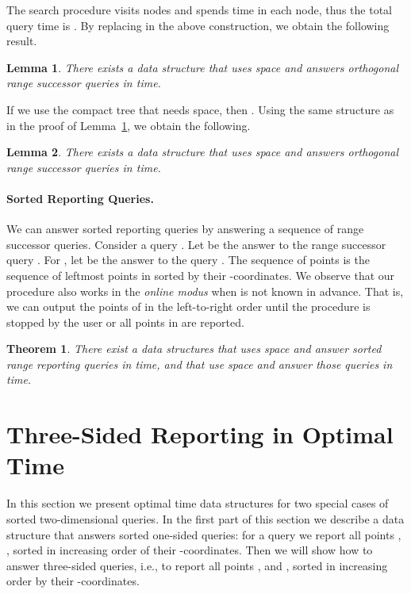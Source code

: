 \documentclass[11pt]{article}
\newcommand{\no}[1]{}
\newtheorem{theorem}{Theorem}
\newtheorem{lemma}{Lemma}
\begin{document}
The search procedure visits  nodes and spends
 time in each node, thus the total query time is
. By replacing  in the above
construction, we obtain the following result.
\begin{lemma}\label{lemma:linsucc}
  There exists a data structure that uses  space and answers
  orthogonal range successor queries in  time.
\end{lemma}
If we use the compact tree that needs  space,
then . Using the same structure as in the proof of 
Lemma~\ref{lemma:linsucc}, we obtain the following.
\begin{lemma}\label{lemma:llsucc}
  There exists a data structure that uses  space and
  answers orthogonal range successor queries in 
  time.
\end{lemma}


\paragraph{Sorted Reporting Queries.} 
We can answer sorted reporting queries by answering a sequence of 
range successor queries. Consider a query . 
Let  be the answer to the range successor query .
For , let  be the answer to the query 
.  
The sequence of points  is the sequence of  leftmost 
points in  sorted by their -coordinates. We observe 
that our procedure also works in the \emph{online modus} when   is not known in advance. That is, we can output the points of  in the left-to-right order until the procedure is stopped by the user or 
all points in  are reported.
\no{
 leftmost point,  then the next one, etc;   the query can be stopped at any time by 
the user. The total query time is the same as the time needed to answer 
 range successor queries. } 
\begin{theorem}\label{theor:spaceeff}
There exist a data structures that uses  space and answer
  sorted range reporting queries in  time, and that
use  space 
and answer those queries in  
time.
\end{theorem}




\section{Three-Sided Reporting in Optimal Time}
\label{sec:3sided-rep}
In this section we present optimal time data structures for two special 
cases of sorted two-dimensional queries.
In the first part of this section we describe a data structure that
answers sorted one-sided queries: for a query  we report all points
, , sorted in increasing order of their -coordinates. 
Then we will show how to answer three-sided queries, i.e., to report all points ,  and
, sorted in increasing order by their -coordinates. 
\end{document}
